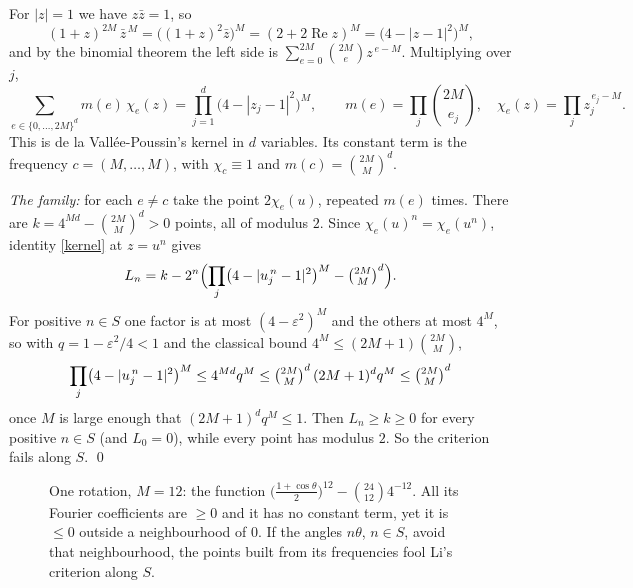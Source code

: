 \documentclass[11pt,a4paper]{article}
\theoremstyle{definition}\newtheorem*{definition}{Definition}
\theoremstyle{remark}\newtheorem*{remark}{Remark}
\newcommand{\re}{\operatorname{Re}}
\begin{document}
For $|z|=1$ we have $z\bar z=1$, so
\[ (1+z)^{2M}\,\bar z^{\,M}=\bigl((1+z)^2\bar z\bigr)^M=(2+2\re z)^M=\bigl(4-|z-1|^2\bigr)^M ,\]
and by the binomial theorem the left side is $\sum_{e=0}^{2M}\binom{2M}{e}z^{\,e-M}$. Multiplying
over $j$,
\begin{equation}\label{kernel}
\sum_{e\in\{0,\dots,2M\}^d} m(e)\,\chi_e(z)=\prod_{j=1}^{d}\bigl(4-|z_j-1|^2\bigr)^M,
\qquad m(e)=\prod_j\binom{2M}{e_j},\quad \chi_e(z)=\prod_j z_j^{\,e_j-M}.
\end{equation}
This is de la Vall\'ee-Poussin's kernel in $d$ variables. Its constant term is the frequency
$c=(M,\dots,M)$, with $\chi_c\equiv1$ and $m(c)=\binom{2M}{M}^d$.

\emph{The family:} for each $e\ne c$ take the point $2\chi_e(u)$, repeated $m(e)$ times. There are
$k=4^{Md}-\binom{2M}{M}^d>0$ points, all of modulus $2$. Since $\chi_e(u)^n=\chi_e(u^n)$,
identity \eqref{kernel} at $z=u^n$ gives
\[ L_n=k-2^n\Bigl(\prod_{j}\bigl(4-|u_j^{\,n}-1|^2\bigr)^M-\tbinom{2M}{M}^d\Bigr). \]
For positive $n\in S$ one factor is at most $(4-\varepsilon^2)^M$ and the others at most $4^M$, so
with $q=1-\varepsilon^2/4<1$ and the classical bound $4^M\le(2M+1)\binom{2M}{M}$,
\[ \prod_{j}\bigl(4-|u_j^{\,n}-1|^2\bigr)^M\le 4^{Md}q^M\le\tbinom{2M}{M}^d\,(2M+1)^d q^M
\le\tbinom{2M}{M}^d \]
once $M$ is large enough that $(2M+1)^dq^M\le1$. Then $L_n\ge k\ge0$ for every positive $n\in S$
(and $L_0=0$), while every point has modulus $2$. So the criterion fails along $S$. \qed

\begin{figure}[h]\centering
{}
\caption{One rotation, $M=12$: the function $\bigl(\tfrac{1+\cos\theta}{2}\bigr)^{12}-\binom{24}{12}4^{-12}$.
All its Fourier coefficients are $\ge0$ and it has no constant term, yet it is $\le 0$ outside a
neighbourhood of $0$. If the angles $n\theta$, $n\in S$, avoid that neighbourhood, the points
built from its frequencies fool Li's criterion along $S$.}
\end{figure}
\end{document}
